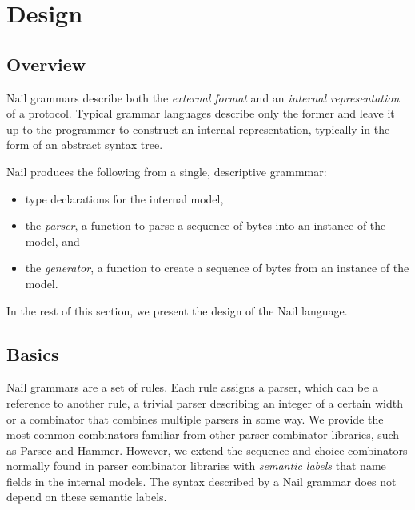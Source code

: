 \section{Design}
\label{s:design}

\subsection{Overview}
 
Nail grammars describe both the \emph{external format} and an \emph{internal representation} of a
protocol. Typical grammar languages describe only the former and leave it up to the programmer to
construct an internal representation, typically in the form of an abstract syntax tree. 


Nail produces the following from a single, descriptive grammmar: 

\begin{itemize}
\item type declarations for the internal model,
\item the \textit{parser}, a function to parse a sequence of bytes into an
instance of the model, and
\item the \textit{generator}, a function to create a
sequence of bytes from an instance of the model.
\end{itemize}

\noindent
In the rest of this section, we present the design of the Nail language.

\subsection{Basics}
Nail grammars are a set of rules. Each rule assigns a parser, which can be a reference to another
rule, a trivial parser describing an integer of a certain width or a combinator that combines
multiple parsers in some way. We provide the most common combinators familiar from other parser
combinator libraries, such as Parsec\cite{LeijenMeijer:parsec} and Hammer\cite{hammer-parser}.
However, we extend the sequence and choice combinators normally found in parser combinator libraries
with \emph{semantic labels} that name fields in the internal models. The syntax described by a Nail
grammar does not depend on these semantic labels.

